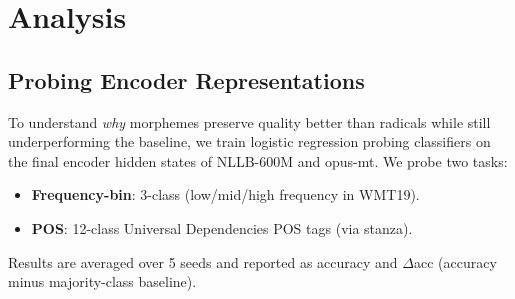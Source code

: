 \documentclass[11pt]{article}
\begin{document}
\section{Analysis}
\label{sec:analysis}

\subsection{Probing Encoder Representations}
\label{sec:probing}

To understand \textit{why} morphemes preserve quality better than radicals while still underperforming the baseline, we train logistic regression probing classifiers \citep{conneau-etal-2018-cram} on the final encoder hidden states of NLLB-600M and opus-mt. We probe two tasks:

\begin{itemize}
\item \textbf{Frequency-bin}: 3-class (low/mid/high frequency in WMT19).
\item \textbf{POS}: 12-class Universal Dependencies POS tags (via stanza).
\end{itemize}

Results are averaged over 5 seeds and reported as accuracy and $\Delta$acc (accuracy minus majority-class baseline).
\end{document}
